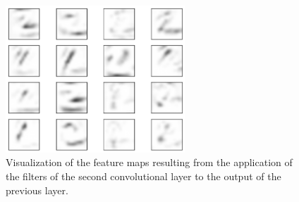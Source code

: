 \begin{figure}
	\centering
	\includegraphics[width=0.6\textwidth]{Images/conv_outputLev2_digit2}
	\caption{Visualization of the feature maps resulting from the application of the filters of the second convolutional layer to the output of the previous layer.}
	\label{fig:outputLev2}
\end{figure}

